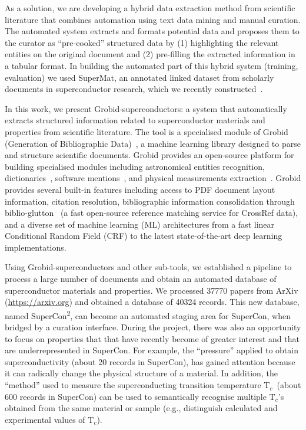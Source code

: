 \documentclass[]{interact}
\theoremstyle{plain}%
\theoremstyle{definition}
\theoremstyle{remark}
\newcommand{\tc}{T$_{c}$}
\begin{document}
As a solution, we are developing a hybrid data extraction method from scientific literature that combines automation using text data mining and manual curation.
The automated system extracts and formats potential data and proposes them to the curator as ``pre-cooked'' structured data by (1) highlighting the relevant entities on the original document and (2) pre-filling the extracted information in a tabular format.
In building the automated part of this hybrid system (training, evaluation) we used SuperMat, an annotated linked dataset from scholarly documents in superconductor research, which we recently constructed~\cite{foppiano2021supermat}.

In this work, we present Grobid-superconductors: a system that automatically extracts structured information related to superconductor materials and properties from scientific literature.
The tool is a specialised module of Grobid (Generation of Bibliographic Data)~\cite{GROBID}, a machine learning library designed to parse and structure scientific documents.
Grobid provides an open-source platform for building specialised modules including astronomical entities recognition\cite{grobid-astro}, dictionaries~\cite{khemakhem:hal-01508868}, software mentions~\cite{lopez2021mining}, and physical measurements extraction~\cite{foppiano2019quantities}.
Grobid provides several built-in features including access to PDF document layout information, citation resolution, bibliographic information consolidation through biblio-glutton~\cite{biblio-glutton-lookup} (a fast open-source reference matching service for CrossRef data), and a diverse set of machine learning (ML) architectures from a fast linear Conditional Random Field (CRF) to the latest state-of-the-art deep learning implementations.

Using Grobid-superconductors and other sub-tools, we established a pipeline to process a large number of documents and obtain an automated database of superconductor materials and properties.
We processed 37770 papers from ArXiv (\url{https://arxiv.org}) and obtained a database of 40324 records.
This new database, named SuperCon\textsuperscript{2}, can become an automated staging area for SuperCon, when bridged by a curation interface.
During the project, there was also an opportunity to focus on properties that that have recently become of greater interest and that are underrepresented in SuperCon.
For example, the ``pressure'' applied to obtain superconductivity (about 20 records in SuperCon), has gained attention because it can radically change the physical structure of a material.
In addition, the ``method'' used to measure the superconducting transition temperature \tc~(about 600 records in SuperCon) can be used to semantically recognise multiple \tc 's obtained from the same material or sample (e.g., distinguish calculated and experimental values of \tc).
\end{document}
